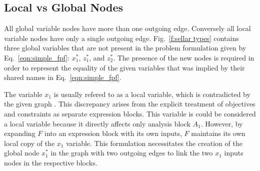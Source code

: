 
%
%

\subsection{Local vs Global Nodes }

  All global variable nodes have more than one outgoing edge. Conversely all local 
  variable nodes have only a single outgoing edge. Fig.~\ref{f:sellar types} contains 
  three global variables that are not present in the problem formulation given by 
  Eq.~\ref{eqn:simple_fpf}: $x_1^*$, $z_1^*$, and $z_2^*$. The presence of the 
  new nodes is required in order to represent the equality of the given variables that
  was implied by their shared names in Eq.~\ref{eqn:simple_fpf}. 

  The variable $x_1$ is usually refered to as a local variable, which is 
  contradicted by the given graph \cite{Sellar1996}. This discrepancy 
  arises from the explicit treatment of objectives and constraints as separate 
  expression blocks. This variable is could be considered a local 
  variable because it directly affects only analysis block $A_1$. However, by expanding
  $F$ into an expression block with its own inputs, $F$ maintains its own local 
  copy of the $x_1$ variable. This formulation necessitates the creation of the global 
  node $x_1^*$ in the graph with two outgoing edges to link the two $x_1$ inputs nodes 
  in the respective blocks. 

